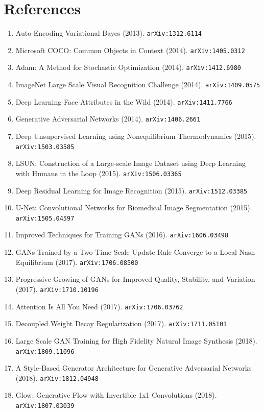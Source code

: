 \documentclass[11pt]{article}
\begin{document}
\section*{References}
\begin{enumerate}\small
  \item Auto-Encoding Variational Bayes (2013). \texttt{arXiv:1312.6114}
  \item Microsoft COCO: Common Objects in Context (2014). \texttt{arXiv:1405.0312}
  \item Adam: A Method for Stochastic Optimization (2014). \texttt{arXiv:1412.6980}
  \item ImageNet Large Scale Visual Recognition Challenge (2014). \texttt{arXiv:1409.0575}
  \item Deep Learning Face Attributes in the Wild (2014). \texttt{arXiv:1411.7766}
  \item Generative Adversarial Networks (2014). \texttt{arXiv:1406.2661}
  \item Deep Unsupervised Learning using Nonequilibrium Thermodynamics (2015). \texttt{arXiv:1503.03585}
  \item LSUN: Construction of a Large-scale Image Dataset using Deep Learning
  with Humans in the Loop (2015). \texttt{arXiv:1506.03365}
  \item Deep Residual Learning for Image Recognition (2015). \texttt{arXiv:1512.03385}
  \item U-Net: Convolutional Networks for Biomedical Image Segmentation (2015). \texttt{arXiv:1505.04597}
  \item Improved Techniques for Training GANs (2016). \texttt{arXiv:1606.03498}
  \item GANs Trained by a Two Time-Scale Update Rule Converge to a Local Nash
  Equilibrium (2017). \texttt{arXiv:1706.08500}
  \item Progressive Growing of GANs for Improved Quality, Stability, and
  Variation (2017). \texttt{arXiv:1710.10196}
  \item Attention Is All You Need (2017). \texttt{arXiv:1706.03762}
  \item Decoupled Weight Decay Regularization (2017). \texttt{arXiv:1711.05101}
  \item Large Scale GAN Training for High Fidelity Natural Image Synthesis (2018). \texttt{arXiv:1809.11096}
  \item A Style-Based Generator Architecture for Generative Adversarial Networks (2018). \texttt{arXiv:1812.04948}
  \item Glow: Generative Flow with Invertible 1x1 Convolutions (2018). \texttt{arXiv:1807.03039}

\end{enumerate}
\end{document}
